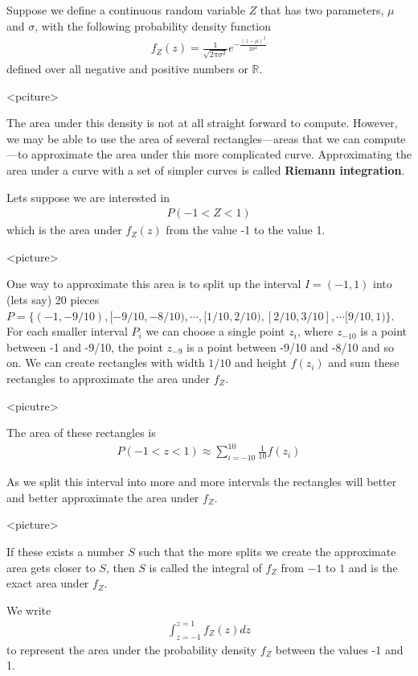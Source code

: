Suppose we define a continuous random variable $Z$ that has two parameters, $\mu$ and $\sigma$, with the following probability density function 
\begin{align}
    f_{Z}(z) = \frac{1}{\sqrt{2 \pi \sigma^{2} } } e^{ -\frac{(z-\mu)^{2}}{2\sigma^{2}}  }
\end{align}
defined over all negative and positive numbers or $\mathbb{R}$.

<pciture>

The area under this density is not at all straight forward to compute. 
However, we may be able to use the area of several rectangles---areas that we can compute---to approximate the area under this more complicated curve. 
Approximating the area under a curve with a set of simpler curves is called \textbf{Riemann integration}. 

Lets suppose we are interested in 
\begin{align}
    P( -1 < Z < 1 )
\end{align}
which is the area under $f_{Z}(z)$ from the value -1 to the value 1.

<picture>

One way to approximate this area is to split up the interval $I = (-1,1)$ into (lets say) 20 pieces $P = \{ (-1,-9/10),[-9/10, -8/10), \cdots, [1/10,2/10), [2/10, 3/10], \cdots [9/10,1) \}$. 
For each smaller interval $P_{i}$ we can choose a single point $z_{i}$, where $z_{-10}$ is a point between -1 and -9/10, the point $z_{-9}$ is a point between -9/10 and -8/10 and so on.
We can create rectangles with width $1/10$ and height $f(z_{i})$ and sum these rectangles to approximate the area under $f_{Z}$. 

<picutre>

The area of these rectangles is 
\begin{align}
    P(-1 < z < 1) \approx \sum_{i=-10}^{10} \frac{1}{10} f(z_{i})
\end{align}

As we split this interval into more and more intervals the rectangles will better and better approximate the area under $f_{Z}$. 

<picture>

If these exists a number $S$ such that the more splits we create the approximate area gets closer to $S$, then $S$ is called the integral of $f_{Z}$ from $-1$ to $1$ and is the exact area under $f_{Z}$. 

We write 
\begin{align}
    \int_{z=-1}^{z=1} f_{Z}(z) dz
\end{align}
to represent the area under the probability density $f_{Z}$ between the values -1 and 1.

